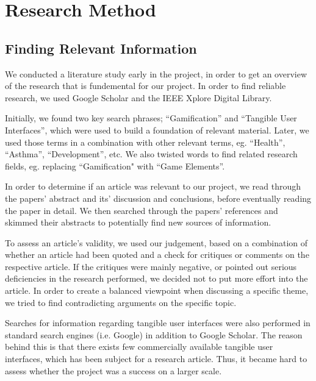 \chapter{Research Method}
\label{chp:researchmethod}

\section{Finding Relevant Information}
\label{sec:literaturestudy}

We conducted a literature study early in the project, in order to get an overview of the research that is fundemental for our project. In order to find reliable research, we used Google Scholar and the IEEE Xplore Digital Library. 

Initially, we found two key search phrases; ``Gamification'' and ``Tangible User Interfaces'', which were used to build a foundation of relevant material. Later, we used those terms in a combination with other relevant terms, eg. ``Health'', ``Asthma'', ``Development'', etc. We also twisted words to find related research fields, eg. replacing ``Gamification" with ``Game Elements''. 

In order to determine if an article was relevant to our project, we read through the papers' abstract and its' discussion and conclusions, before eventually reading the paper in detail. We then searched through the papers' references and skimmed their abstracts to potentially find new sources of information. 

To assess an article's validity, we used our judgement, based on a combination of whether an article had been quoted and a check for critiques or comments on the respective article. If the critiques were mainly negative, or pointed out serious deficiencies in the research performed, we decided not to put more effort into the article. In order to create a balanced viewpoint when discussing a specific theme, we tried to find contradicting arguments on the specific topic.  

Searches for information regarding tangible user interfaces were also performed in standard search engines (i.e. Google) in addition to Google Scholar. The reason behind this is that there exists few commercially available tangible user interfaces, which has been subject for a research article. Thus, it became hard to assess whether the project was a success on a larger scale. 
 

